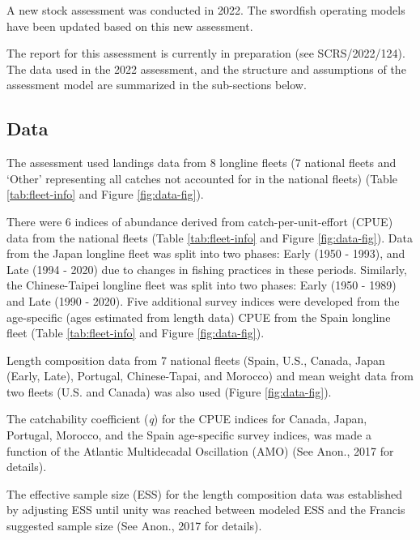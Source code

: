 \documentclass[
]{article}
\begin{document}
A new stock assessment was conducted in 2022. The swordfish operating models have been updated based on this new assessment.

The report for this assessment is currently in preparation (see SCRS/2022/124). The data used in the 2022 assessment, and the structure and assumptions of the assessment model are summarized in the sub-sections below.

\hypertarget{data}{%
\subsection{Data}\label{data}}

The assessment used landings data from 8 longline fleets (7 national fleets and `Other' representing all catches not accounted for in the national fleets) (Table \ref{tab:fleet-info} and Figure \ref{fig:data-fig}).

There were 6 indices of abundance derived from catch-per-unit-effort (CPUE) data from the national fleets (Table \ref{tab:fleet-info} and Figure \ref{fig:data-fig}). Data from the Japan longline fleet was split into two phases: Early (1950 - 1993), and Late (1994 - 2020) due to changes in fishing practices in these periods. Similarly, the Chinese-Taipei longline fleet was split into two phases: Early (1950 - 1989) and Late (1990 - 2020). Five additional survey indices were developed from the age-specific (ages estimated from length data) CPUE from the Spain longline fleet (Table \ref{tab:fleet-info} and Figure \ref{fig:data-fig}).

Length composition data from 7 national fleets (Spain, U.S., Canada, Japan (Early, Late), Portugal, Chinese-Tapai, and Morocco) and mean weight data from two fleets (U.S. and Canada) was also used (Figure \ref{fig:data-fig}).

The catchability coefficient (\emph{q}) for the CPUE indices for Canada, Japan, Portugal, Morocco, and the Spain age-specific survey indices, was made a function of the Atlantic Multidecadal Oscillation (AMO) (See Anon., 2017 for details).

The effective sample size (ESS) for the length composition data was established by adjusting ESS until unity was reached between modeled ESS and the Francis suggested sample size (See Anon., 2017 for details).
\end{document}
